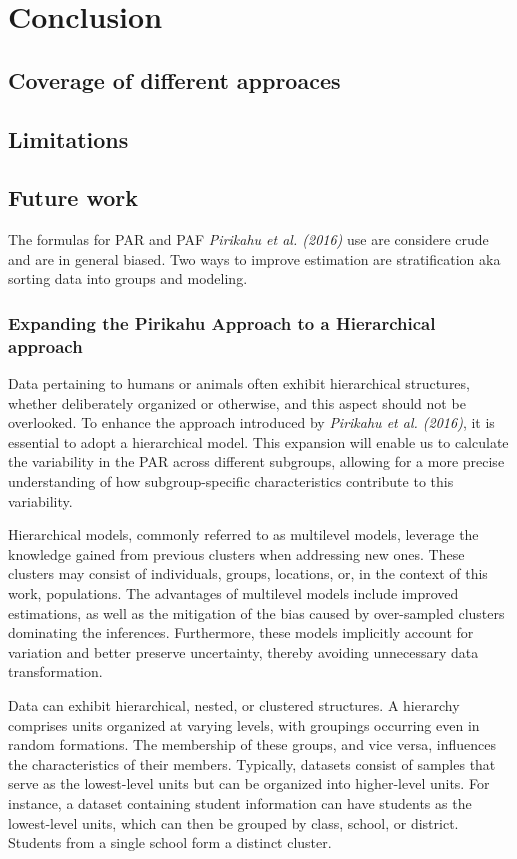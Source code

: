 \chapter{Conclusion} \label{Conclusion}

\section{Coverage of different approaces}

\section{Limitations}
\section{Future work}\label{FutureWork}

The formulas for PAR and PAF \textit{Pirikahu et al. (2016)} use are considere crude and are in general biased. Two ways to improve estimation are stratification aka sorting data into groups and modeling. \cite{DiMaso2020AttributableFF} 

\subsection{Expanding the Pirikahu Approach to a Hierarchical approach} \label{sec:Expanding}

Data pertaining to humans or animals often exhibit hierarchical structures, whether deliberately organized or otherwise, and this aspect should not be overlooked.\cite{Goldstein2010MultilevelSM} To enhance the approach introduced by \textit{Pirikahu et al. (2016)}, it is essential to adopt a hierarchical model. This expansion will enable us to calculate the variability in the PAR across different subgroups, allowing for a more precise understanding of how subgroup-specific characteristics contribute to this variability.

Hierarchical models, commonly referred to as multilevel models, leverage the knowledge gained from previous clusters when addressing new ones. These clusters may consist of individuals, groups, locations, or, in the context of this work, populations. The advantages of multilevel models include improved estimations, as well as the mitigation of the bias caused by over-sampled clusters dominating the inferences. Furthermore, these models implicitly account for variation and better preserve uncertainty, thereby avoiding unnecessary data transformation.\cite{Mcelreath2015StatisticalRA}

Data can exhibit hierarchical, nested, or clustered structures. A hierarchy comprises units organized at varying levels, with groupings occurring even in random formations. The membership of these groups, and vice versa, influences the characteristics of their members.\cite{Goldstein2010MultilevelSM} Typically, datasets consist of samples that serve as the lowest-level units but can be organized into higher-level units. For instance, a dataset containing student information can have students as the lowest-level units, which can then be grouped by class, school, or district. Students from a single school form a distinct cluster.\cite{HierarchicalModelsForSurveyData}

